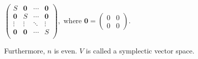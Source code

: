 \documentclass[12pt]{article}
\begin{document}
\begin{center}$
\begin{pmatrix}
S & \boldsymbol{0} & \cdots & \boldsymbol{0} \\
\boldsymbol{0} & S & \cdots & \boldsymbol{0} \\
\vdots & \vdots & \ddots & \vdots \\
\boldsymbol{0} & \boldsymbol{0} & \cdots & S \\
\end{pmatrix},\mbox{ where }\boldsymbol{0}=
\begin{pmatrix}
0 & 0 \\ 0 & 0
\end{pmatrix}.
$\end{center}

Furthermore, $n$ is even.  $V$ is called a symplectic vector space.
\end{document}
